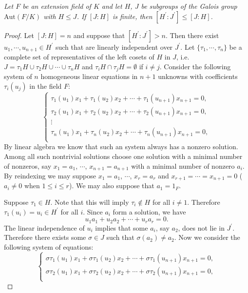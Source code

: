 \begin{lemma}\em
Let $F$ be an extension field of $K$ and let $H$, $J$ be subgroups of the Galois group $\mathrm{Aut}(F/K)$ with $H\le J$. If $[J:H]$ is finite, then $[H^\prime:J^\prime]\le[J:H]$.
\end{lemma}
\begin{proof}
Let $[J:H]=n$ and suppose that $[H^\prime:J^\prime]>n$. Then there exist $u_1,\cdots,u_{n+1}\in H^\prime$ such that are linearly independent over $J^\prime$. Let $\{\tau_1,\cdots,\tau_n\}$ be a complete set of representatives of the left cosets of $H$ in $J$, i.e. $J=\tau _1H\cup \tau _2H\cup \cdots \cup \tau _nH$ and $\tau_iH\cap\tau_jH=\emptyset$ if $i\ne j$. Consider the following system of $n$ homogeneous linear equations in $n+1$ unknowns with coefficients $\tau_i(u_j)$ in the field $F$: 
$$
\begin{cases}
	\tau _1\left( u_1 \right) x_1+\tau _1\left( u_2 \right) x_2+\cdots +\tau _1\left( u_{n+1} \right) x_{n+1}=0,\\
	\tau _2\left( u_1 \right) x_1+\tau _2\left( u_2 \right) x_2+\cdots +\tau _2\left( u_{n+1} \right) x_{n+1}=0,\\
	\vdots\\
	\tau _n\left( u_1 \right) x_1+\tau _n\left( u_2 \right) x_2+\cdots +\tau _n\left( u_{n+1} \right) x_{n+1}=0,\\
\end{cases}
$$
By linear algebra we know that such an system always has a nonzero solution. Among all such nontrivial solutions choose one solution with a minimal number of nonzeros, say $x_1=a_1$, $\cdots$, $x_{n+1}=a_{n+1}$ with a minimal number of nonzero $a_i$. By reindexing we may suppose $x_1=a_1$, $\cdots$, $x_r=a_r$ and $x_{r+1}=\cdots=x_{n+1}=0$ ($a_i\ne 0$ when $1\le i\le r$). We may also suppose that $a_1=1_F$.\par
Suppose $\tau_1\in H$. Note that this will imply $\tau_i\notin H$ for all $i\ne 1$. Therefore $\tau_1(u_i)=u_i\in H^\prime$ for all $i$. Since $a_i$ form a solution, we have 
$$
u_1a_1+u_2a_2+\cdots +u_ra_r=0.
$$
The linear independence of $u_i$ implies that some $a_i$, say $a_2$, does not lie in $J^\prime$. Therefore there exists some $\sigma\in J$ such that $\sigma(a_2)\ne a_2$. Now we consider the following system of equations: 
$$
\begin{cases}
	\sigma \tau _1\left( u_1 \right) x_1+\sigma \tau _1\left( u_2 \right) x_2+\cdots +\sigma \tau _1\left( u_{n+1} \right) x_{n+1}=0,\\
	\sigma \tau _2\left( u_1 \right) x_1+\sigma \tau _2\left( u_2 \right) x_2+\cdots +\sigma \tau _2\left( u_{n+1} \right) x_{n+1}=0,\\

\end{cases}$$
\end{proof}
